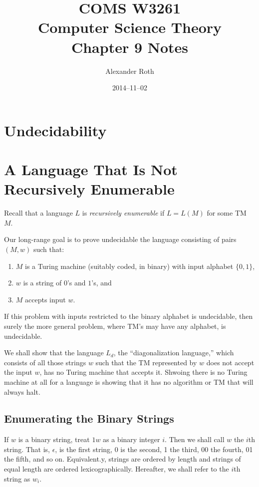 \documentclass[]{article}
\begin{document}
\title{COMS W3261 \\ Computer Science Theory \\ Chapter 9 Notes}
\author{Alexander Roth}
\date{2014--11--02}
\maketitle
\theoremstyle{definition}
\newtheorem{thm}{Theorem}
\section*{Undecidability}
\section*{A Language That Is Not Recursively Enumerable}
Recall that a language $L$ is \emph{recursively enumerable} if $L = L(M)$ for
some TM $M$.

Our long-range goal is to prove undecidable the language consisting of pairs
$(M,w)$ such that:
\begin{enumerate}
\item $M$ is a Turing machine (suitably coded, in binary) with input alphabet
$\{0,1\}$,
\item $w$ is a string of $0$'s and $1$'s, and
\item $M$ accepts input $w$.
\end{enumerate}
If this problem with inputs restricted to the binary alphabet is undecidable,
then surely the more general problem, where TM's may have any alphabet, is
undecidable.

We shall show that the language $L_d$, the ``diagonalization language,'' which
consists of all those strings $w$ such that the TM represented by $w$ does not
accept the input $w$, has no Turing machine that accepts it. Shwoing there is no
Turing machine at all for a language is showing that it has no algorithm or TM
that will always halt.

\subsection*{Enumerating the Binary Strings}
If $w$ is a binary string, treat $1w$ as a binary integer $i$. Then we shall
call $w$ the $i$th string. That is, $\epsilon$, is the first string, 0 is the
second, 1 the third, 00 the fourth, 01 the fifth, and so on. Equivalent.y,
strings are ordered by length and strings of equal length are ordered
lexicographically. Hereafter, we shall refer to the $i$th string as $w_i$.
\end{document}
